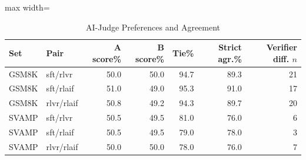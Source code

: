 \begin{table}[!htbp]
\centering

\scriptsize
\setlength{\tabcolsep}{3.4pt}
\begin{adjustbox}{max width=\linewidth}
\begin{tabular}{llrrrrr}
\toprule
Set & Pair & A score\% & B score\% & Tie\% & Strict agr.\% & Verifier diff. $n$ \\
\midrule
GSM8K & sft/rlvr & 50.0 & 50.0 & 94.7 & 89.3 & 21 \\
GSM8K & sft/rlaif & 51.0 & 49.0 & 95.3 & 91.0 & 17 \\
GSM8K & rlvr/rlaif & 50.8 & 49.2 & 94.3 & 89.7 & 20 \\
SVAMP & sft/rlvr & 50.5 & 49.5 & 81.0 & 76.0 & 6 \\
SVAMP & sft/rlaif & 50.5 & 49.5 & 79.0 & 78.0 & 3 \\
SVAMP & rlvr/rlaif & 50.0 & 50.0 & 78.0 & 76.0 & 7 \\
\bottomrule
\end{tabular}

\end{adjustbox}
\caption{AI-Judge Preferences and Agreement}
\label{tab:pairwise}

\end{table}
